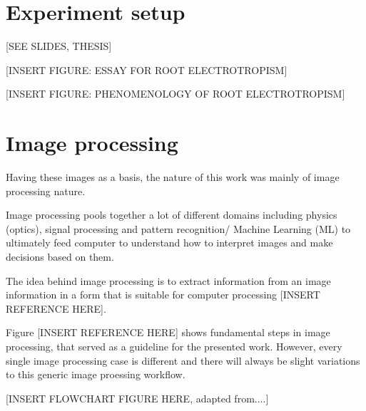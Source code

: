 \section{Experiment setup}

[SEE SLIDES, THESIS]

[INSERT FIGURE: ESSAY FOR ROOT ELECTROTROPISM]

[INSERT FIGURE: PHENOMENOLOGY OF ROOT ELECTROTROPISM]


\section{Image processing}

Having these images as a basis, the nature of this work was mainly of image processing nature.

Image processing pools together a lot of different domains including physics (optics), signal processing and pattern recognition/ Machine Learning (ML) to ultimately feed computer to understand how to interpret images and make decisions based on them. 

The idea behind image processing is to extract information from an image information in a form that is suitable for computer processing [INSERT REFERENCE HERE]. 

Figure [INSERT REFERENCE HERE] shows fundamental steps in image processing, that served as a guideline for the presented work. However, every single image processing case is different and there will always be slight variations to this generic image proessing workflow.



[INSERT FLOWCHART FIGURE HERE, adapted from....]


